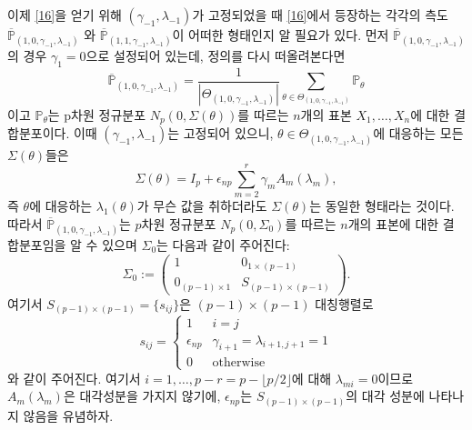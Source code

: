 이제 \eqref{16}을 얻기 위해  $(\gamma_{-1}, \lambda_{-1})$가 고정되었을 때 \eqref{16}에서  등장하는 각각의 측도 $\overline{\mathbb{P}}_{(1,0,\gamma_{-1}, \lambda_{-1})} $ 와 $\overline{\mathbb{P}}_{(1,1,\gamma_{-1}, \lambda_{-1})} $이 어떠한 형태인지 알 필요가 있다. 먼저 $\overline{\mathbb{P}}_{(1,0,\gamma_{-1}, \lambda_{-1})}$의 경우 $\gamma_1=0$으로 설정되어 있는데, 정의를 다시 떠올려본다면
\[
\overline{\mathbb{P}}_{(1,0,\gamma_{-1}, \lambda_{-1})} = \frac{1}{|\Theta_{(1,0,\gamma_{-1}, \lambda_{-1})}|} \sum_{\theta \in \Theta_{(1,0,\gamma_{-1}, \lambda_{-1})}} \mathbb{P}_\theta
\]
이고 $\mathbb{P}_\theta$는 p차원 정규분포 $N_p(0,\Sigma(\theta))$를 따르는 $n$개의 표본 $X_1, \dots, X_n$에 대한 결합분포이다. 이때 $(\gamma_{-1}, \lambda_{-1})$는 고정되어 있으니, $\theta\in\Theta_{(1,0,\gamma_{-1}, \lambda_{-1})}$에 대응하는 모든 $\Sigma(\theta)$들은 
\[
\Sigma(\theta) = I_p + \epsilon_{np} \sum_{m=2}^r \gamma_m A_m (\lambda_m),
\]
즉 $\theta$에 대응하는 $\lambda_1(\theta)$가 무슨 값을 취하더라도 $\Sigma(\theta)$는 동일한 형태라는 것이다. 따라서 $\overline{\mathbb{P}}_{(1,0,\gamma_{-1}, \lambda_{-1})}$는 $p$차원 정규분포 $N_p(0,\Sigma_0)$를 따르는 $n$개의 표본에 대한 결합분포임을 알 수 있으며 $\Sigma_0$는 다음과 같이 주어진다:
\[
\Sigma_0 := \left(\begin{array}{c|c} 1 & 0_{1\times(p-1)} \\ \hline 
0_{(p-1)\times 1} & S_{(p-1)\times (p-1)}\end{array} \right).
\]
여기서 $S_{(p-1)\times(p-1)} = \{s_{ij}\}$은 $(p-1)\times (p-1)$ 대칭행렬로
\[
s_{ij} = \left\{\begin{array}{ll} 1 & i=j\\
\epsilon_{np} & \gamma_{i+1} =\lambda_{i+1, j+1} = 1\\
0 & \mbox{otherwise} \end{array}\right.
\]
와 같이 주어진다. 여기서 $i=1, \dots, p-r = p-\lfloor p/2 \rfloor$에 대해 $\lambda_{mi}=0$이므로 $A_m(\lambda_m)$은 대각성분을 가지지 않기에,  $\epsilon_{np}$는  $S_{(p-1)\times(p-1)}$의 대각 성분에 나타나지 않음을 유념하자. \\

